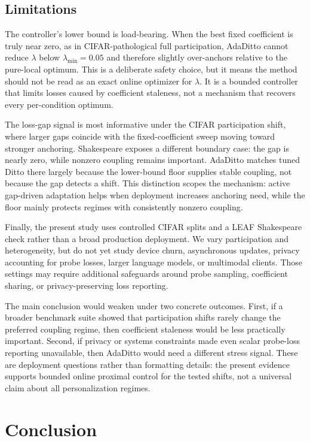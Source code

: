 \documentclass[letterpaper]{article} %
\begin{document}
\subsection{Limitations}

The controller's lower bound is load-bearing. When the best fixed
coefficient is truly near zero, as in CIFAR-pathological full
participation, AdaDitto cannot reduce $\lambda$ below
$\lambda_{\min}=0.05$ and therefore slightly over-anchors relative to
the pure-local optimum. This is a deliberate safety choice, but it
means the method should not be read as an exact online optimizer for
$\lambda$. It is a bounded controller that limits losses caused by
coefficient staleness, not a mechanism that recovers every per-condition
optimum.

The loss-gap signal is most informative under the CIFAR participation
shift, where larger gaps coincide with the fixed-coefficient sweep
moving toward stronger anchoring. Shakespeare exposes a different
boundary case: the gap is nearly zero, while nonzero coupling remains
important. AdaDitto matches tuned Ditto there largely because the
lower-bound floor supplies stable coupling, not because the gap detects
a shift. This distinction scopes the mechanism: active gap-driven
adaptation helps when deployment increases anchoring need, while the
floor mainly protects regimes with consistently nonzero coupling.

Finally, the present study uses controlled CIFAR splits and a LEAF
Shakespeare check rather than a broad production deployment. We vary
participation and heterogeneity, but do not yet study device churn,
asynchronous updates, privacy accounting for probe losses, larger
language models, or multimodal clients. Those settings may require
additional safeguards around probe sampling, coefficient sharing, or
privacy-preserving loss reporting.

The main conclusion would weaken under two concrete outcomes. First,
if a broader benchmark suite showed that participation shifts rarely
change the preferred coupling regime, then coefficient staleness would
be less practically important. Second, if privacy or systems
constraints made even scalar probe-loss reporting unavailable, then
AdaDitto would need a different stress signal. These are deployment
questions rather than formatting details: the present evidence supports
bounded online proximal control for the tested shifts, not a universal
claim about all personalization regimes.

\section{Conclusion}
\end{document}

